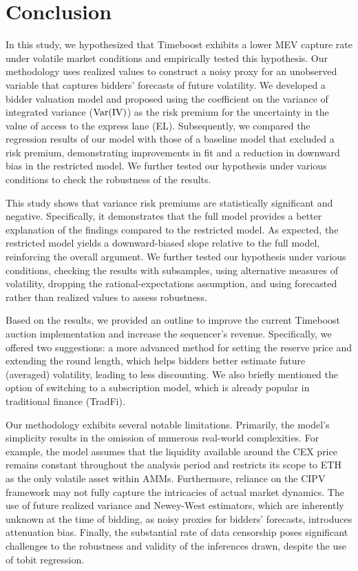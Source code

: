 
\section{Conclusion}
In this study, we hypothesized that Timeboost exhibits a lower MEV capture rate under volatile market conditions and empirically tested this hypothesis. Our methodology uses realized values to construct a noisy proxy for an unobserved variable that captures bidders' forecasts of future volatility. We developed a bidder valuation model and proposed using the coefficient on the variance of integrated variance ($\mathrm{Var}(\mathrm{IV})$) as the risk premium for the uncertainty in the value of access to the express lane (EL). 
Subsequently, we compared the regression results of our model with those of a baseline model that excluded a risk premium, demonstrating improvements in fit and a reduction in downward bias in the restricted model. We further tested our hypothesis under various conditions to check the robustness of the results.

This study shows that variance risk premiums are statistically significant and negative. Specifically, it demonstrates that the full model provides a better explanation of the findings compared to the restricted model. As expected, the restricted model yields a downward-biased slope relative to the full model, reinforcing the overall argument. We further tested our hypothesis under various conditions, checking the results with subsamples, using alternative measures of volatility, dropping the rational-expectations assumption, and using forecasted rather than realized values to assess robustness.

Based on the results, we provided an outline to improve the current Timeboost auction implementation and increase the sequencer's revenue. Specifically, we offered two suggestions: a more advanced method for setting the reserve price and extending the round length, which helps bidders better estimate future (averaged) volatility, leading to less discounting. We also briefly mentioned the option of switching to a subscription model, which is already popular in traditional finance (TradFi).

Our methodology exhibits several notable limitations. Primarily, the model's simplicity results in the omission of numerous real-world complexities. For example, the model assumes that the liquidity available around the CEX price remains constant throughout the analysis period and restricts its scope to ETH as the only volatile asset within AMMs. Furthermore, reliance on the CIPV framework may not fully capture the intricacies of actual market dynamics. The use of future realized variance and Newey-West estimators, which are inherently unknown at the time of bidding, as noisy proxies for bidders’ forecasts, introduces attenuation bias. Finally, the substantial rate of data censorship poses significant challenges to the robustness and validity of the inferences drawn, despite the use of tobit regression.


